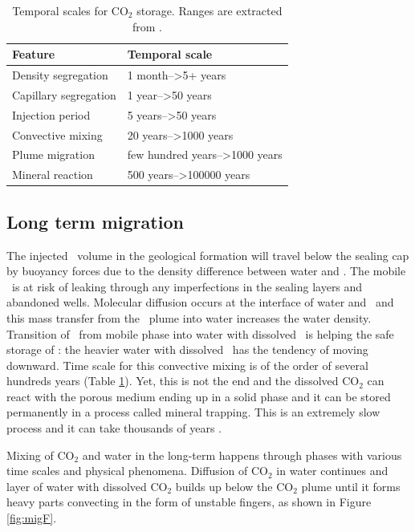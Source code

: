 \begin{table}
\center
  \caption{Temporal scales for $\mbox{CO}_2$ storage. Ranges are extracted from
\cite{celia2011geological,gunter1997aquifer}.}
\begin{tabular}{ |l|l| }
    \hline
    Feature& Temporal scale \\
    \hline
    Density segregation & 1 month-->5+ years\\
    \hline
    Capillary segregation & 1 year-->50 years\\
    \hline
    Injection period & 5 years-->50 years\\
    \hline
    Convective mixing & 20 years-->1000 years\\
    \hline
    Plume migration & few hundred years-->1000 years\\
    \hline
    Mineral reaction & 500 years-->100000 years \\
    \hline
  \end{tabular}
  \label{tab:tscl}
\end{table}

\subsection{Long term migration}

The injected \coo\ volume in the geological formation will travel below
the sealing cap by buoyancy forces due to the density difference between water
and \coo. The mobile \coo\ is at risk of leaking through any imperfections in the sealing
layers and abandoned wells. Molecular diffusion occurs at the interface of water
and \coo\ and this mass transfer from the \coo\ plume into water
increases the water density. Transition of \coo\ from mobile phase
into water with dissolved \coo\ is helping the safe storage of
\coo: the heavier water with dissolved \coo\ has the tendency
of moving downward. Time scale for this convective mixing is of the order of
several hundreds years (Table \ref{tab:tscl}). Yet, this is not the end and   the
dissolved $\mbox{CO}_2$ can react with the porous medium ending up in a solid
phase and it can be stored permanently in a process called mineral trapping.
This is an 
extremely slow process and it can take thousands of years
\cite{gunter1997aquifer}.

Mixing of $\mbox{CO}_2$ and water in the long-term happens through phases with various time scales and physical phenomena. Diffusion of
$\mbox{CO}_2$ in water continues and layer of water with dissolved
$\mbox{CO}_2$ builds up below the $\mbox{CO}_2$ plume until it forms heavy parts convecting in
the form of unstable fingers, as shown in Figure \ref{fig:migF}.


